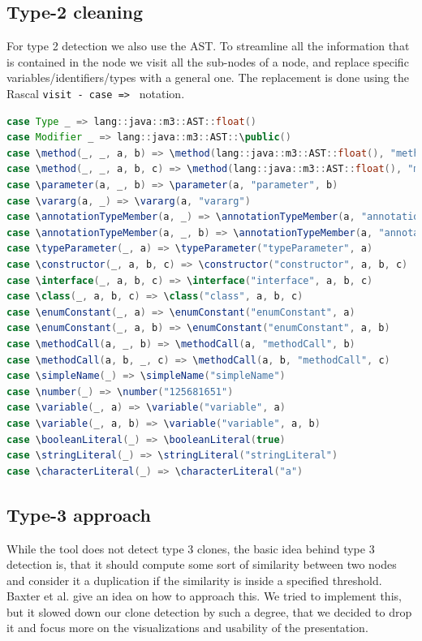 \documentclass{uva-inf-article}
\begin{document}
\subsection{Type-2 cleaning}\label{type2alg}

For type 2 detection we also use the AST. To streamline all the information that is contained in the node we visit all the sub-nodes of a node,  and replace specific variables/identifiers/types with a general one. The replacement is done using the Rascal \texttt{visit - case => } notation.

\begin{lstlisting}[language=Java, style=mystyle,caption={Node elements stripping method for type-2 clone detection.},captionpos=b]
case Type _ => lang::java::m3::AST::float()
case Modifier _ => lang::java::m3::AST::\public()
case \method(_, _, a, b) => \method(lang::java::m3::AST::float(), "method", a, b)
case \method(_, _, a, b, c) => \method(lang::java::m3::AST::float(), "method", a, b, c)
case \parameter(a, _, b) => \parameter(a, "parameter", b)
case \vararg(a, _) => \vararg(a, "vararg") 
case \annotationTypeMember(a, _) => \annotationTypeMember(a, "annotationTypeMember")
case \annotationTypeMember(a, _, b) => \annotationTypeMember(a, "annotationTypeMember", b)
case \typeParameter(_, a) => \typeParameter("typeParameter", a)
case \constructor(_, a, b, c) => \constructor("constructor", a, b, c)
case \interface(_, a, b, c) => \interface("interface", a, b, c)
case \class(_, a, b, c) => \class("class", a, b, c)
case \enumConstant(_, a) => \enumConstant("enumConstant", a) 
case \enumConstant(_, a, b) => \enumConstant("enumConstant", a, b)
case \methodCall(a, _, b) => \methodCall(a, "methodCall", b)
case \methodCall(a, b, _, c) => \methodCall(a, b, "methodCall", c)
case \simpleName(_) => \simpleName("simpleName")
case \number(_) => \number("125681651")
case \variable(_, a) => \variable("variable", a) 
case \variable(_, a, b) => \variable("variable", a, b) 
case \booleanLiteral(_) => \booleanLiteral(true)
case \stringLiteral(_) => \stringLiteral("stringLiteral")
case \characterLiteral(_) => \characterLiteral("a")
\end{lstlisting}

\subsection{Type-3 approach}
While the tool does not detect type 3 clones, the basic idea behind type 3 detection is, that it should compute some sort of similarity between two nodes and consider it a duplication if the similarity is inside a specified threshold. Baxter et al. \cite{baxter1998clone} give an idea on how to approach this. We tried to implement this, but it slowed down our clone detection by such a degree, that we decided to drop it and focus more on the visualizations and usability of the presentation. 
\end{document}
